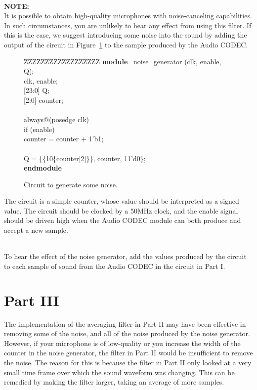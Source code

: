\documentclass[epsfig,10pt,fullpage]{article}
\begin{document}
~\\
{\bf NOTE:}
~\\
It is possible to obtain high-quality microphones with noise-canceling capabilities. In such circumstances, you are unlikely
to hear any effect from using this filter. If this is the case, we suggest introducing some noise into the sound by adding
the output of the circuit in Figure~\ref{fig:noise_circuit} to the sample produced by the {\sf Audio CODEC}.

\begin{figure}[h]
\begin{center}
\begin{minipage}[t]{12.5 cm}
\begin{tabbing}
ZZ\=ZZ\=ZZ\=ZZ\=ZZ\=ZZ\=ZZ\=ZZ\=ZZ\kill
{\bf module} ~noise\_generator (clk, enable, Q);\\
 clk, enable;\\
 [23:0] Q;\\
 [2:0] counter;\\
~\\
\>always@(posedge clk)\\
\>\>if (enable)\\
\>\>\>counter = counter + 1'b1;\\
\>~\\
 Q = \{\{10\{counter[2]\}\}, counter, 11'd0\};\\
{\bf endmodule}\\
\end{tabbing}
\end{minipage}
\end{center}
\caption{Circuit to generate some noise.}
\label{fig:noise_circuit}
\end{figure}

The circuit is a simple counter, whose value should be interpreted as a signed value. The circuit should be clocked by a 50MHz clock, and the enable signal
should be driven high when the {\sf Audio CODEC} module can both produce and accept a new sample.

~\\
To hear the effect of the noise generator, add the values produced by the circuit to each sample of sound from the {\sf Audio CODEC} in the circuit in Part I.

\section*{Part III}
The implementation of the averaging filter in Part II may have been effective in removing some of the noise, and all of the noise produced by the noise generator.
However, if your microphone is of low-quality or you increase the width of the counter in the noise generator, the filter in Part II would be insufficient
to remove the noise. The reason for this is because the filter in Part II only looked at a very small time frame over which the sound waveform was
changing. This can be remedied by making the filter larger, taking an average of more samples.
\end{document}
